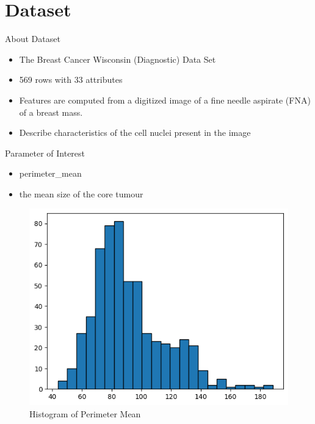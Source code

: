 \section{Dataset}

\begin{frame}{About Dataset}
\begin{itemize}
    \item The Breast Cancer Wisconsin (Diagnostic) Data Set
    \item 569 rows with 33 attributes
    \item Features are computed from a digitized image of a fine needle aspirate (FNA) of a breast mass.
    \item Describe characteristics of the cell nuclei present in the image
\end{itemize}
  
\end{frame}

\begin{frame}{Parameter of Interest}
\begin{itemize}
    \item perimeter\_mean
    \item the mean size of the core tumour
\end{itemize}

\vspace{0.25in}

\begin{figure}
  \centering
  \includegraphics[width=0.5\linewidth]{Project1/Report/images/data-hist.png}
  \caption{Histogram of Perimeter Mean}
\end{figure}
  
\end{frame}
